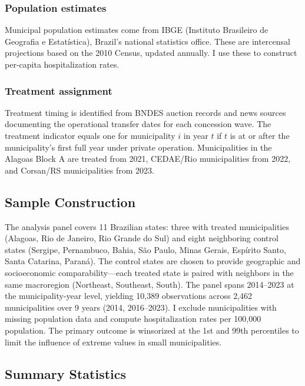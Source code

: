 \documentclass[12pt]{article}
\begin{document}
\subsubsection*{Population estimates} Municipal population estimates come from IBGE (Instituto Brasileiro de Geografia e Estat\'{i}stica), Brazil's national statistics office. These are intercensal projections based on the 2010 Census, updated annually. I use these to construct per-capita hospitalization rates.

\subsubsection*{Treatment assignment} Treatment timing is identified from BNDES auction records and news sources documenting the operational transfer dates for each concession wave. The treatment indicator equals one for municipality $i$ in year $t$ if $t$ is at or after the municipality's first full year under private operation. Municipalities in the Alagoas Block A are treated from 2021, CEDAE/Rio municipalities from 2022, and Corsan/RS municipalities from 2023.

\subsection{Sample Construction}

The analysis panel covers 11 Brazilian states: three with treated municipalities (Alagoas, Rio de Janeiro, Rio Grande do Sul) and eight neighboring control states (Sergipe, Pernambuco, Bahia, S\~{a}o Paulo, Minas Gerais, Esp\'{i}rito Santo, Santa Catarina, Paran\'{a}). The control states are chosen to provide geographic and socioeconomic comparability---each treated state is paired with neighbors in the same macroregion (Northeast, Southeast, South). The panel spans 2014--2023 at the municipality-year level, yielding 10,389 observations across 2,462 municipalities over 9 years (2014, 2016--2023). I exclude municipalities with missing population data and compute hospitalization rates per 100,000 population. The primary outcome is winsorized at the 1st and 99th percentiles to limit the influence of extreme values in small municipalities.

\subsection{Summary Statistics}


\end{document}
